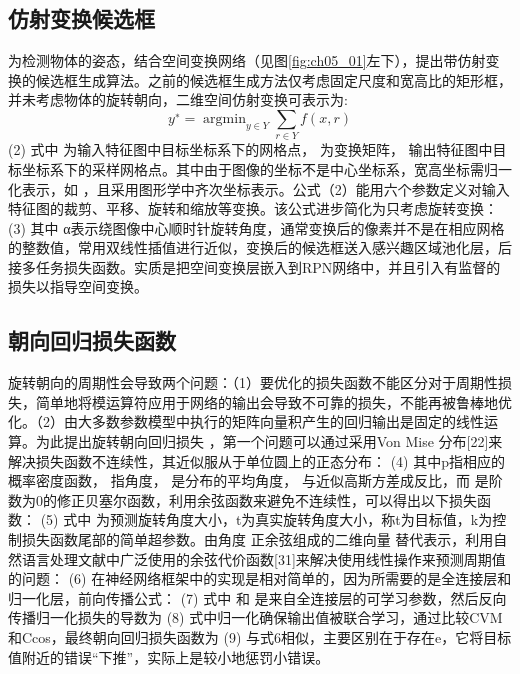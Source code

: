 \subsection{仿射变换候选框}
 
为检测物体的姿态，结合空间变换网络\citep{Jaderberg2015}（见图\ref{fig:ch05_01}左下），提出带仿射变换的候选框生成算法。之前的候选框生成方法仅考虑固定尺度和宽高比的矩形框，并未考虑物体的旋转朝向，二维空间仿射变换可表示为:
\begin{equation} \label{eq:ch05_02}
      y^∗=\mathop{\arg\min}_{y\in Y}\sum _{r\in Y} f(x,r)
\end{equation}                    	(2)
式中 为输入特征图中目标坐标系下的网格点， 为变换矩阵， 输出特征图中目标坐标系下的采样网格点。其中由于图像的坐标不是中心坐标系，宽高坐标需归一化表示，如 ，且采用图形学中齐次坐标表示。公式（2）能用六个参数定义对输入特征图的裁剪、平移、旋转和缩放等变换。该公式进步简化为只考虑旋转变换：
      	                    	(3)
其中 α表示绕图像中心顺时针旋转角度，通常变换后的像素并不是在相应网格的整数值，常用双线性插值进行近似，变换后的候选框送入感兴趣区域池化层，后接多任务损失函数。实质是把空间变换层嵌入到RPN网络中，并且引入有监督的损失以指导空间变换。
\subsection{朝向回归损失函数}
旋转朝向的周期性会导致两个问题：（1）要优化的损失函数不能区分对于周期性损失，简单地将模运算符应用于网络的输出会导致不可靠的损失，不能再被鲁棒地优化。（2）由大多数参数模型中执行的矩阵向量积产生的回归输出是固定的线性运算。为此提出旋转朝向回归损失 ，第一个问题可以通过采用Von Mise 分布[22]来解决损失函数不连续性，其近似服从于单位圆上的正态分布：
	                            	  					             (4)
其中p指相应的概率密度函数， 指角度， 是分布的平均角度， 与近似高斯方差成反比，而  是阶数为0的修正贝塞尔函数，利用余弦函数来避免不连续性，可以得出以下损失函数：
         			                    (5)
式中 为预测旋转角度大小，t为真实旋转角度大小，称t为目标值，k为控制损失函数尾部的简单超参数。由角度 正余弦组成的二维向量 替代表示，利用自然语言处理文献中广泛使用的余弦代价函数[31]来解决使用线性操作来预测周期值的问题：
     					                   (6)
在神经网络框架中的实现是相对简单的，因为所需要的是全连接层和归一化层，前向传播公式：
                      			                    	(7)
式中  和  是来自全连接层的可学习参数，然后反向传播归一化损失的导数为
	                 			     (8)
式中归一化确保输出值被联合学习，通过比较CVM和Ccos，最终朝向回归损失函数为
	                           									 (9)  
与式6相似，主要区别在于存在e，它将目标值附近的错误“下推”，实际上是较小地惩罚小错误。
